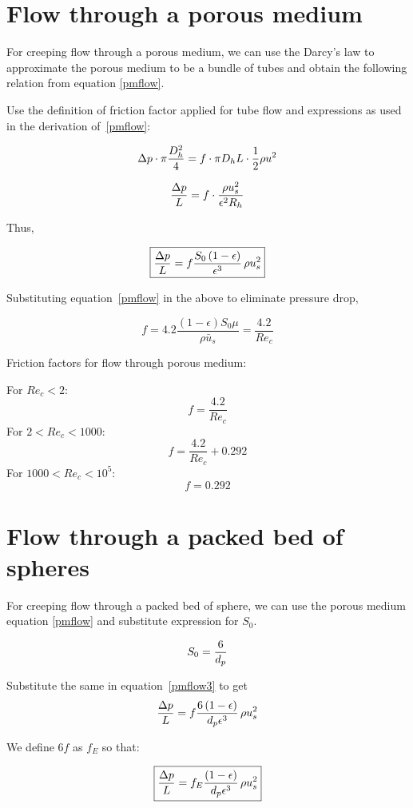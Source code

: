 \section{Flow through a porous medium}

For creeping flow through a porous medium, we can use the Darcy's law to approximate the porous medium to be a bundle of tubes and obtain the following relation from equation \ref{pmflow}.

Use the definition of friction factor applied for tube flow and expressions as used in the derivation of~\ref{pmflow}:

$$ \Delta p \cdot \pi {D_h^2 \over 4} = f \cdot \pi D_h L \cdot {1 \over 2} \rho u^2$$

$$ {\Delta p \over L} = f \cdot {\rho u_s^2 \over  \epsilon^2 R_h} $$

Thus,

\begin{equation}
\boxed{
{\Delta p \over L} = f {S_0 \left(1 - \epsilon \right) \over \epsilon^3} \, \rho u_s^2
}
\label{pmflow3}
\end{equation}

Substituting equation~\ref{pmflow} in the above to eliminate pressure drop,

$$ f =  4.2 \frac{ \left( 1-\epsilon\right) S_0 \mu}{\rho \bar{u}_s} = \frac{4.2}{Re_c} $$


Friction factors for flow through porous medium:

For $Re_c < 2$: $$f = \frac{4.2}{Re_c} $$
For $2 < Re_c < 1000 $: $$f = \frac{4.2}{Re_c} + 0.292 $$
For $1000 < Re_c < 10^5 $: $$f = 0.292 $$

\section{Flow through a packed bed of spheres}

For creeping flow through a packed bed of sphere, we can use the porous medium equation \ref{pmflow} and substitute expression for $S_0$.

$$S_0 = {6 \over d_p}$$

Substitute the same in equation~\ref{pmflow3} to get
\begin{equation}
{\Delta p \over L} = f {6 \left(1 - \epsilon \right) \over d_p \epsilon^3} \, \rho u_s^2
\end{equation}

We define $6f$ as $f_E$ so that:

\begin{equation}
\boxed{
{\Delta p \over L} = f_E {\left(1 - \epsilon \right) \over d_p \epsilon^3} \, \rho u_s^2
}
\label{pmflow4}
\end{equation}

